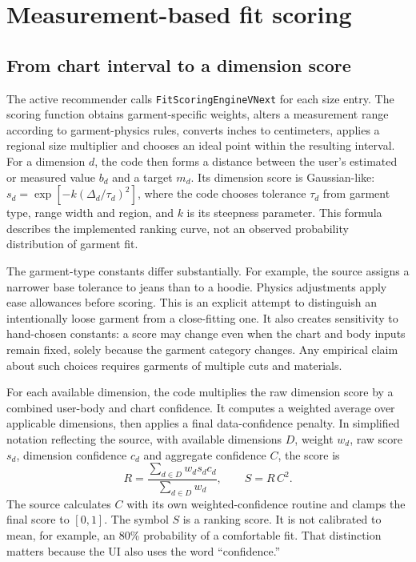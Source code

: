 \documentclass[11pt,a4paper]{article}
\begin{document}
\section{Measurement-based fit scoring}
\subsection{From chart interval to a dimension score}
The active recommender calls \texttt{FitScoringEngineVNext} for each size entry. The scoring function obtains garment-specific weights, alters a measurement range according to garment-physics rules, converts inches to centimeters, applies a regional size multiplier and chooses an ideal point within the resulting interval. For a dimension $d$, the code then forms a distance between the user's estimated or measured value $b_d$ and a target $m_d$. Its dimension score is Gaussian-like: $s_d=\exp[-k(\Delta_d/\tau_d)^2]$, where the code chooses tolerance $\tau_d$ from garment type, range width and region, and $k$ is its steepness parameter. This formula describes the implemented ranking curve, not an observed probability distribution of garment fit.

The garment-type constants differ substantially. For example, the source assigns a narrower base tolerance to jeans than to a hoodie. Physics adjustments apply ease allowances before scoring. This is an explicit attempt to distinguish an intentionally loose garment from a close-fitting one. It also creates sensitivity to hand-chosen constants: a score may change even when the chart and body inputs remain fixed, solely because the garment category changes. Any empirical claim about such choices requires garments of multiple cuts and materials.

For each available dimension, the code multiplies the raw dimension score by a combined user-body and chart confidence. It computes a weighted average over applicable dimensions, then applies a final data-confidence penalty. In simplified notation reflecting the source, with available dimensions $D$, weight $w_d$, raw score $s_d$, dimension confidence $c_d$ and aggregate confidence $C$, the score is
\begin{equation}
 R=\frac{\sum_{d\in D}w_d s_dc_d}{\sum_{d\in D}w_d},\qquad S=R\,C^2.
\end{equation}
The source calculates $C$ with its own weighted-confidence routine and clamps the final score to $[0,1]$. The symbol $S$ is a ranking score. It is not calibrated to mean, for example, an 80\% probability of a comfortable fit. That distinction matters because the UI also uses the word ``confidence.''
\end{document}
